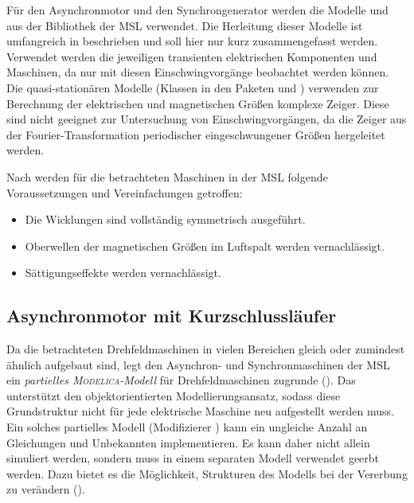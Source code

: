 Für den Asynchronmotor und den Synchrongenerator werden die Modelle  und  aus der Bibliothek  der MSL verwendet. Die Herleitung dieser Modelle ist umfangreich in \cite[]{kralModelicaObjektorientierteModellbildung2019} beschrieben und soll hier nur kurz zusammengefasst werden. Verwendet werden die jeweiligen transienten elektrischen Komponenten und Maschinen, da nur mit diesen Einschwingvorgänge beobachtet werden können. Die quasi-stationären Modelle (Klassen in den Paketen  und ) verwenden zur Berechnung der elektrischen und magnetischen Größen komplexe Zeiger. Diese sind nicht geeignet zur Untersuchung von Einschwingvorgängen, da die Zeiger aus der Fourier-Transformation periodischer eingeschwungener Größen hergeleitet werden.

Nach \cite[S. 149]{kralModelicaObjektorientierteModellbildung2019} werden für die betrachteten Maschinen in der MSL folgende Voraussetzungen und Vereinfachungen getroffen:
\begin{itemize}
	\item Die Wicklungen sind vollständig symmetrisch ausgeführt.
	\item Oberwellen der magnetischen Größen im Luftspalt werden vernachlässigt.
	\item Sättigungseffekte werden vernachlässigt.
\end{itemize}

\subsection{Asynchronmotor mit Kurzschlussläufer}\label{sec:asynchronmotor-mit-kurzschlussluxe4ufer}
Da die betrachteten Drehfeldmaschinen in vielen Bereichen gleich oder zumindest ähnlich aufgebaut sind, legt \cite{kralModelicaObjektorientierteModellbildung2019} den Asynchron- und Synchronmaschinen der MSL ein \emph{partielles \textsc{Modelica}-Modell} für Drehfeldmaschinen zugrunde (). Das unterstützt den objektorientierten Modellierungsansatz, sodass diese Grundstruktur nicht für jede elektrische Maschine neu aufgestellt werden muss. Ein solches partielles Modell (Modifizierer ) kann ein ungleiche Anzahl an Gleichungen und Unbekannten implementieren. Es kann daher nicht allein simuliert werden, sondern muss in einem separaten Modell verwendet geerbt werden. Dazu bietet es die Möglichkeit, Strukturen des Modells bei der Vererbung zu verändern ().

